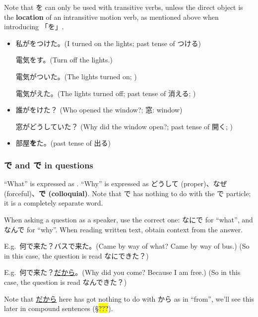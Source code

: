 \documentclass[../nihongo-gakushuu-kyouzai.tex]{subfiles}
\begin{document}
Note that を can only be used with transitive verbs, unless the direct object is the \textbf{location} of an intransitive motion verb, as mentioned above when introducing 「を」.
\begin{itemize}
    \item 私がをつけた。(I turned on the lights; past tense of つける)

    電気をす。(Turn off the lights.)

    電気がついた。(The lights turned on; )

    電気がえた。(The lights turned off; past tense of 消える; )
    \item 誰がをけた？ (Who opened the window?; 窓: window)

    窓がどうしていた？ (Why did the window open?; past tense of 開く; )
    \item 部屋\textbf{を}た。(past tense of 出る)
\end{itemize}

\subsubsection{で and で in questions}
``What'' is expressed as \textbf{}. ``Why'' is expressed as どうして (proper)、なぜ (forceful)、\textbf{で (colloquial)}. Note that で has nothing to do with the で particle; it is a completely separate word.

When asking a question as a speaker, use the correct one: なにで for ``what'', and なんで for ``why''. When reading written text, obtain context from the answer. 

E.g.\ 何で来た？バスで来た。(Came by way of what? Came by  way of bus.) (So in this case, the question is read なにできた？)

E.g.\ 何で来た？\underline{だから}。(Why did you come? Because I am free.) (So in this case, the question is read なんできた？)

Note that \underline{だから} here has got nothing to do with から as in ``from'', we'll see this later in compound sentences (\S\hl{???}).
\end{document}
